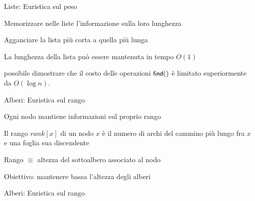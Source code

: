 \begin{frame}{Liste: Euristica sul peso}

\vspace{-9pt}
\begin{myboxtitle}
\BIL
\item Memorizzare nelle liste l’informazione sulla loro lunghezza
\item Agganciare la lista più corta a quella più lunga
\item La lunghezza della lista può essere mantenuta in tempo $O(1)$
\EIL 
\end{myboxtitle}

\begin{myboxtitle}[Complessità]
\BIL
\item \EE possibile dimostrare che il costo delle operazioni $\textsf{{\small find}}()$ è limitato superiormente da $O(\log n)$.
\EIL
\end{myboxtitle}
\end{frame}

\begin{frame}{Alberi: Euristica sul rango}

\vspace{-9pt}
\begin{myboxtitle}
\BIL
\item Ogni nodo mantiene informazioni sul proprio rango
\item Il rango $\mathit{rank}[x]$ di un nodo $x$ è il numero di archi 
del cammino più lungo fra $x$ e una foglia sua discendente
\item Rango $\equiv$ altezza del sottoalbero associato al nodo
\item Obiettivo: mantenere bassa l'altezza degli alberi
\EIL 
\end{myboxtitle}

\end{frame}

\begin{frame}{Alberi: Euristica sul rango}

\vspace{-15pt}

\end{frame}

